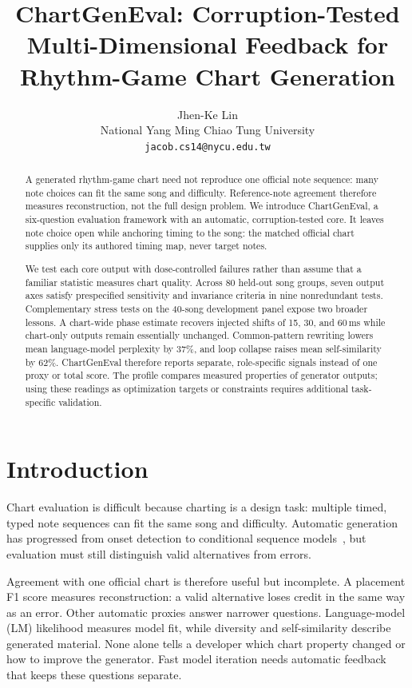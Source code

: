\documentclass[10pt,twocolumn]{article}
\title{\bfseries ChartGenEval: Corruption-Tested Multi-Dimensional
Feedback for Rhythm-Game Chart Generation}
\author{Jhen-Ke Lin\\
  National Yang Ming Chiao Tung University\\
  \texttt{jacob.cs14@nycu.edu.tw}}
\date{}
\begin{document}
\maketitle

\begin{abstract}
A generated rhythm-game chart need not reproduce one official note
sequence: many note choices can fit the same song and difficulty.
Reference-note agreement therefore measures reconstruction, not the full
design problem. We introduce ChartGenEval, a six-question evaluation
framework with an automatic, corruption-tested core. It leaves note choice
open while anchoring timing to the song: the matched official chart supplies
only its authored timing map, never target notes.

We test each core output with dose-controlled failures rather than assume
that a familiar statistic measures chart quality. Across 80 held-out song
groups, seven output axes satisfy prespecified sensitivity and invariance
criteria in nine nonredundant tests. Complementary stress tests on the
40-song development panel expose two broader lessons. A chart-wide phase
estimate recovers injected shifts of 15, 30, and 60\,ms while chart-only
outputs remain essentially unchanged. Common-pattern rewriting lowers
mean language-model perplexity by 37\%, and loop collapse raises mean
self-similarity by 62\%.
ChartGenEval therefore reports separate, role-specific signals instead of one
proxy or total score. The profile compares measured properties of generator
outputs; using these readings as optimization targets or constraints requires
additional task-specific validation.
\end{abstract}

\section{Introduction}\label{sec:intro}

Chart evaluation is difficult because charting is a design task: multiple
timed, typed note sequences can fit the same song and difficulty. Automatic
generation has progressed from onset detection to conditional sequence
models~\cite{donahue2017ddc,halina2021taikonation,takada2023genelive,
hanzen2025tcp}, but evaluation must still distinguish valid alternatives from
errors.

Agreement with one official chart is therefore useful but incomplete. A
placement F1 score measures reconstruction: a valid alternative loses credit
in the same way as an error. Other automatic proxies answer narrower
questions. Language-model
(LM) likelihood measures model fit, while diversity and self-similarity
describe generated material. None alone tells a developer which chart
property changed or how to improve the generator. Fast model iteration needs
automatic feedback that keeps these questions separate.
\end{document}
